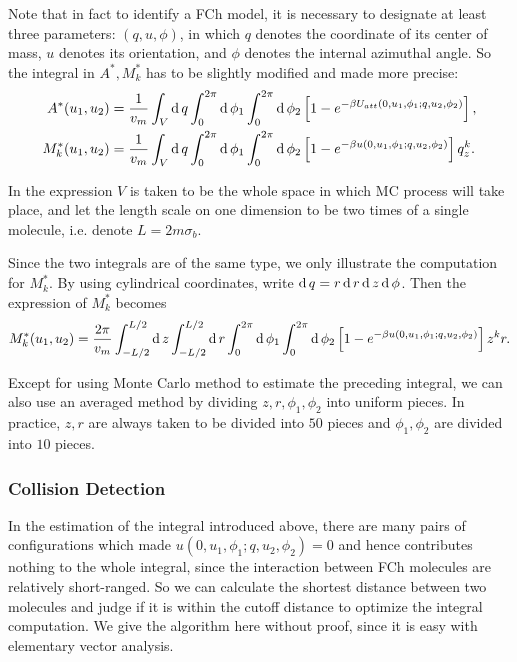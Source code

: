 Note that in fact to identify a FCh model, it is necessary to designate at least three parameters: $(q,u,\phi)$, in which $q$ denotes the coordinate of its center of mass, $u$ denotes its orientation, and $\phi$ denotes the internal azimuthal angle. So the integral in $A^*,M_k^*$ has to be slightly modified and made more precise:
\begin{equation}
	\begin{split}
		A^*(u_1,u_2)&=\frac{1}{v_m}\int_V\operatorname{d}q \int_0^{2\pi}\operatorname{d}\phi_1\int_0^{2\pi}\operatorname{d}\phi_2 \left[1-e^{-\beta U_{att}(0,u_1,\phi_1;q,u_2,\phi_2)}\right],\\
		M_k^*(u_1,u_2)&=\frac{1}{v_m}\int_V\operatorname{d}q \int_0^{2\pi}\operatorname{d}\phi_1\int_0^{2\pi}\operatorname{d}\phi_2 \left[1-e^{-\beta u(0,u_1, \phi_1; q,u_2, \phi_2)}\right]q_z^k.
	\end{split}
\end{equation}

In the expression $V$ is taken to be the whole space in which MC process will take place, and let the length scale on one dimension to be two times of a single molecule, i.e. denote $L = 2m\sigma_b$.

Since the two integrals are of the same type, we only illustrate the computation for $M_k^*$. By using cylindrical coordinates, write $\operatorname{d}q=r\operatorname{d}r\operatorname{d}z\operatorname{d}\phi$. Then the expression of $M_k^*$ becomes
\begin{equation}
	M_k^*(u_1,u_2)=\frac{2\pi}{v_m}\int_{-L/2}^{L/2}\operatorname{d}z\int_{-L/2}^{L/2}\operatorname{d}r \int_0^{2\pi}\operatorname{d}\phi_1\int_0^{2\pi}\operatorname{d}\phi_2 \left[1-e^{-\beta u(0,u_1, \phi_1; q,u_2, \phi_2)}\right]z^kr.
\end{equation}

Except for using Monte Carlo method to estimate the preceding integral, we can also use an averaged method by dividing $z,r,\phi_1,\phi_2$ into uniform pieces. In practice, $z,r$ are always taken to be divided into $50$ pieces and $\phi_1,\phi_2$ are divided into $10$ pieces.

\subsubsection{Collision Detection}
In the estimation of the integral introduced above, there are many pairs of configurations which made $u(0,u_1,\phi_1;q,u_2,\phi_2)=0$ and hence contributes nothing to the whole integral, since the interaction between FCh molecules are relatively short-ranged. So we can calculate the shortest distance between two molecules and judge if it is within the cutoff distance to optimize the integral computation. We give the algorithm here without proof, since it is easy with elementary vector analysis.

